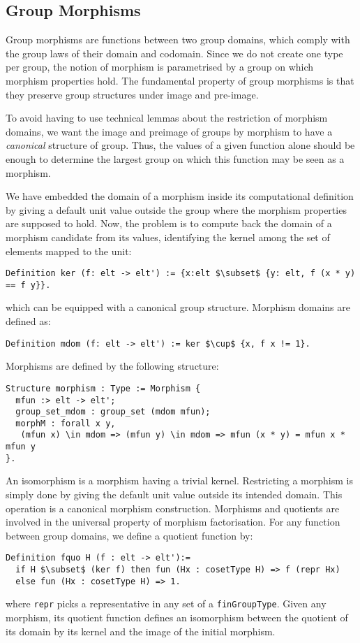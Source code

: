 \subsection{Group Morphisms}
Group morphisms are functions between two group domains, which 
comply with the group laws of their domain and
codomain. Since we do not create one type per group, the notion of
morphism is parametrised by a group on which morphism properties
hold. The fundamental property of group morphisms is that they
preserve group structures under image and pre-image. 

To avoid having to use technical lemmas about the restriction of
morphism domains, we want the image and preimage of groups by morphism to
have a \emph{canonical} structure of group. Thus, the values of a given
function alone should be enough to determine the largest group on which this
function may be seen as a morphism.

We have embedded the domain of a morphism inside its computational definition
by giving a default unit value outside the group
where the morphism properties are supposed to hold.
Now, the problem is to compute back the domain of a morphism candidate from
 its values, identifying the kernel among the set of elements mapped to the unit:
\begin{lstlisting}
Definition ker (f: elt -> elt') := {x:elt $\subset$ {y: elt, f (x * y) == f y}}.
\end{lstlisting}
\noindent which can be equipped with a canonical group structure. Morphism
domains are defined as:
\begin{lstlisting}
Definition mdom (f: elt -> elt') := ker $\cup$ {x, f x != 1}.
\end{lstlisting}
Morphisms are defined by the following structure:
\begin{lstlisting}
Structure morphism : Type := Morphism {
  mfun :> elt -> elt';
  group_set_mdom : group_set (mdom mfun);
  morphM : forall x y, 
   (mfun x) \in mdom => (mfun y) \in mdom => mfun (x * y) = mfun x * mfun y
}.
\end{lstlisting}

An isomorphism is a morphism having a trivial kernel. Restricting a
morphism is simply done by giving the default unit value outside its intended domain.
This operation is a canonical morphism construction.
Morphisms and quotients are involved in the universal property of morphism
factorisation. For any function between group domains, we define a
quotient function by:

\begin{lstlisting}
Definition fquo H (f : elt -> elt'):=
  if H $\subset$ (ker f) then fun (Hx : cosetType H) => f (repr Hx)
  else fun (Hx : cosetType H) => 1.
\end{lstlisting}
where \lstinline[basicstyle=\footnotesize]+repr+ picks a
representative in any set of a
\lstinline[basicstyle=\footnotesize]+finGroupType+.
Given any morphism, its quotient function defines an isomorphism
between the quotient of its domain by its kernel and the image of the
initial morphism.

